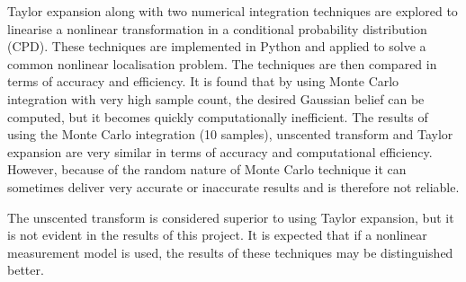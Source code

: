 \documentclass[12pt,oneside,openany,a4paper, %
afrikaans,english,
]{memoir}
\numberwithin{equation}{chapter}
\begin{document}
{Taylor expansion along with two numerical integration techniques are explored to linearise a nonlinear transformation in a conditional probability distribution (CPD). These techniques are implemented in Python and applied to solve a common nonlinear localisation problem. The techniques are then compared in terms of accuracy and efficiency. It is found that by using Monte Carlo integration with very high sample count, the desired Gaussian belief can be computed, but it becomes quickly computationally inefficient. The results of using the Monte Carlo integration (10 samples), unscented transform and Taylor expansion are very similar in terms of accuracy and computational efficiency. However, because of the random nature of Monte Carlo technique it can sometimes deliver very accurate or inaccurate results and is therefore not reliable. 

The unscented transform is considered superior to using Taylor expansion, but it is not evident in the results of this project. It is expected that if a nonlinear measurement model is used, the results of these techniques may be distinguished better.  




\backmatter
{}

\begin{appendices}
\setcounter{table}{0}
\renewcommand{\thetable}{A\arabic{table}}

\end{appendices}}
\end{document}
